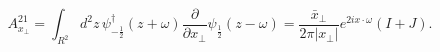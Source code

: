 \begin{equation}
A_{x_\perp}^{21}=
\int_{R^2}d^2z\,
\psi_{-\frac{1}{2}}^\dagger(z+\omega)\frac{\partial}{\partial x_\perp}
\psi_{\frac{1}{2}}(z-\omega)=\frac{\bar x_\perp}{2\pi |x_\perp|}
e^{2ix\cdot\omega} (I+J).
\end{equation}

